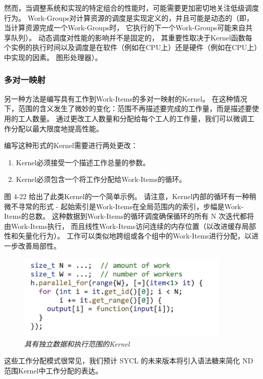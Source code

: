 然而，当调整系统和实现的特定组合的性能时，可能需要更加密切地关注低级调度行为。 
Work-Groups对计算资源的调度是实现定义的，并且可能是动态的（即，当计算资源完成一个Work-Groups时，
它执行的下一个Work-Groups可能来自共享队列）。 动态调度对性能的影响并不是固定的，
其重要性取决于Kernel函数每个实例的执行时间以及调度是在软件（例如在CPU上）还是硬件（例如在CPU上）中实现的因素。 
图形处理器）。

\subsubsection{多对一映射}
另一种方法是编写具有工作到Work-Items的多对一映射的Kernel。 
在这种情况下，范围的含义发生了微妙的变化：范围不再描述要完成的工作量，而是描述要使用的工人数量。 
通过更改工人数量和分配给每个工人的工作量，我们可以微调工作分配以最大限度地提高性能。

编写这种形式的Kernel需要进行两处更改：

\begin{enumerate}
	\item Kernel必须接受一个描述工作总量的参数。

	\item Kernel必须包含一个将工作分配给Work-Items的循环。
\end{enumerate}

图 4-22 给出了此类Kernel的一个简单示例。 请注意，Kernel内部的循环有一种稍微不寻常的形式 - 
起始索引是Work-Items在全局范围内的索引，步幅是Work-Items的总数。 
这种数据到Work-Items的循环调度确保循环的所有 N 次迭代都将由Work-Items执行，
而且线性Work-Items访问连续的内存位置（以改进缓存局部性和矢量化行为）。 
工作可以类似地跨组或各个组中的Work-Items进行分配，以进一步改善局部性。

\begin{figure}[H]
	\centering
	\includegraphics[width=0.9\textwidth]{figs/F4.22.png}
	\caption{\textit{具有独立数据和执行范围的Kernel}}
\end{figure}

这些工作分配模式很常见，我们预计 SYCL 的未来版本将引入语法糖来简化 ND 范围Kernel中工作分配的表达。

